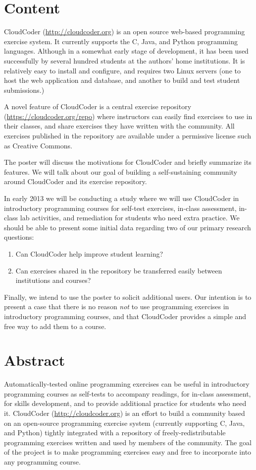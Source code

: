 \documentclass[11pt]{article}
\begin{document}
\section*{Content}

CloudCoder (\url{http://cloudcoder.org}) is an open source web-based
programming exercise system.  It currently supports the C, Java, and
Python programming languages.  Although in a somewhat early stage of
development, it has been used successfully by several hundred students
at the authors' home institutions.  It is relatively easy to
install and configure, and requires two Linux servers
(one to host the web application and database, and another to build
and test student submissions.)

A novel feature of CloudCoder is a central exercise repository
(\url{https://cloudcoder.org/repo}) where
instructors can easily find exercises to use in their classes,
and share exercises they have written with the community.  All exercises
published in the repository are available under a permissive license
such as Creative Commons.

The poster will discuss the motivations for CloudCoder and briefly summarize
its features.  We will talk about our goal of building a self-sustaining
community around CloudCoder and its exercise repository.

In early 2013 we will be conducting a study where we will use CloudCoder
in introductory programming courses for self-test exercises, in-class
assessment, in-class lab activities, and remediation for students who need
extra practice.  We should be able to present some initial data regarding
two of our primary research questions:

\begin{enumerate}
\item Can CloudCoder help improve student learning?
\item Can exercises shared in the repository be transferred
      easily between institutions and courses?
\end{enumerate}

Finally, we intend to use the poster to solicit additional users.
Our intention is to present a case that there is no reason {\em not}
to use programming exercises in introductory programming courses,
and that CloudCoder provides a simple and free way to add them
to a course.

\section*{Abstract}

Automatically-tested online programming exercises can be useful in
introductory programming courses as self-tests to accompany readings,
for in-class assessment, for skills development, and to provide
additional practice for students who need it.  CloudCoder (\url{http://cloudcoder.org}) is
an effort to build a community based on an open-source programming exercise
system (currently supporting C, Java, and Python) tightly integrated
with a repository of freely-redistributable
programming exercises written and used by members of the community.
The goal of the project is to make programming exercises easy and free
to incorporate into any programming course.
\end{document}

